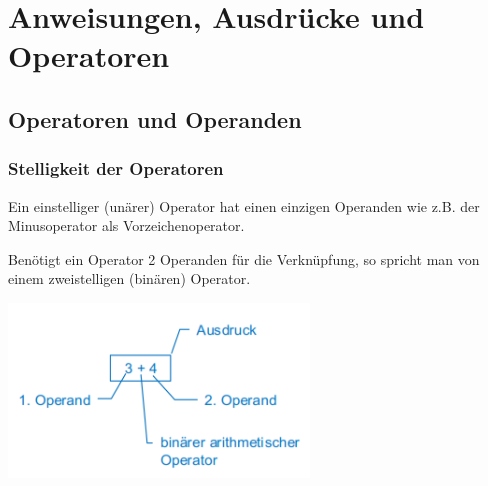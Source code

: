 \section{Anweisungen, Ausdrücke und Operatoren}
	\begin{minipage}[c]{8 cm}
		\subsection{Operatoren und Operanden}
			\subsubsection{Stelligkeit der Operatoren}
				\begin{compactitem}
				 	\item Ein einstelliger (unärer) Operator hat einen einzigen Operanden wie z.B. der Minusoperator als Vorzeichenoperator.
				 	\item Benötigt ein Operator 2 Operanden für die Verknüpfung, so spricht man von einem zweistelligen (binären) Operator.\\ 
				\end{compactitem}
	\end{minipage}
	\hspace*{1cm}
	\begin{minipage}[c]{9 cm}
		\includegraphics[width=0.6\textwidth]{pics/binaerer_Operator.png}	
	\end{minipage}
		
